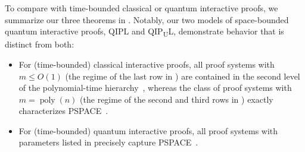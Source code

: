 \documentclass[11pt, a4paper]{article}
\numberwithin{equation}{section}
\numberwithin{figure}{section}
\newcommand{\QIPL}{\textnormal{\textsf{QIPL}}\xspace}
\newcommand{\QIPUL}{\texorpdfstring{\textnormal{\textsf{QIP}\textsubscript{\textnormal{U}}\textsf{L}}}\xspace}
\newcommand{\PSPACE}{\textnormal{\textsf{PSPACE}}\xspace}
\DeclareMathOperator\poly{poly}
\begin{document}
To compare with time-bounded classical or quantum interactive proofs, we summarize our three theorems in . Notably, our two models of space-bounded quantum interactive proofs, \QIPL{} and \QIPUL{}, demonstrate behavior that is distinct from both: 
\begin{itemize}[itemsep=0.33em, topsep=0.33em, parsep=0.33em]
    \item For (time-bounded) classical interactive proofs, all proof systems with $m \leq O(1)$ (the regime of the last row in ) are contained in the second level of the polynomial-time hierarchy~\cite{Babai85,GS86}, whereas the class of proof systems with $m=\poly(n)$ (the regime of the second and third rows in ) exactly characterizes \PSPACE{}~\cite{LFKN92,Shamir92}. 
    \item For (time-bounded) quantum interactive proofs, all proof systems with parameters listed in  precisely capture \PSPACE{}~\cite{Wat99QIP,KW00,JJUW11}.
\end{itemize}
\end{document}
